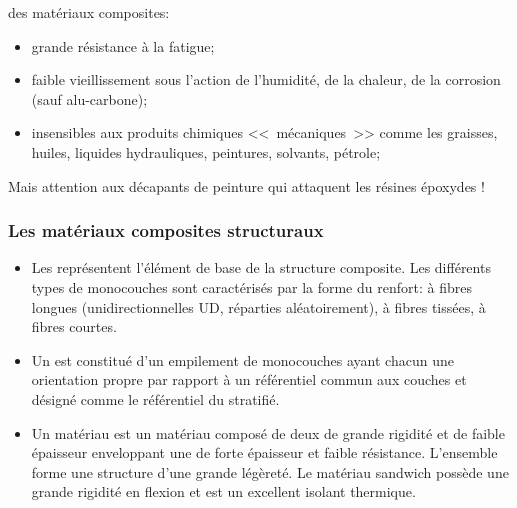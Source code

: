 \medskip
{} des matériaux composites:
\begin{itemize}
	\item grande résistance à la fatigue;
	\item faible vieillissement sous l'action de l'humidité, de la chaleur, de la corrosion (sauf alu-carbone);
	\item insensibles aux produits chimiques <<~mécaniques~>> comme les graisses, huiles, liquides hydrauliques,
		 peintures, solvants, pétrole;
\end{itemize}
Mais attention aux décapants de peinture qui attaquent les résines époxydes !


\medskip
\subsubsection{Les matériaux composites structuraux}

\begin{itemize}
	\item Les  représentent l'élément de base de la structure composite.
		 Les différents types de monocouches sont caractérisés par la forme du renfort:
		 à fibres longues (unidirectionnelles UD, réparties aléatoirement), à fibres tissées,
		 à fibres courtes.
	\item Un  est constitué d'un empilement de monocouches ayant chacun une orientation
		 propre par rapport à un référentiel commun aux couches et désigné comme le
		 référentiel du stratifié.
	\item Un matériau  est un matériau composé de deux 
		 de grande rigidité et de faible épaisseur enveloppant une 
		de forte épaisseur et faible résistance.
		L'ensemble forme une structure d'une grande légèreté.
		Le matériau sandwich possède une grande rigidité en flexion et est un excellent isolant
		 thermique.
\end{itemize}

